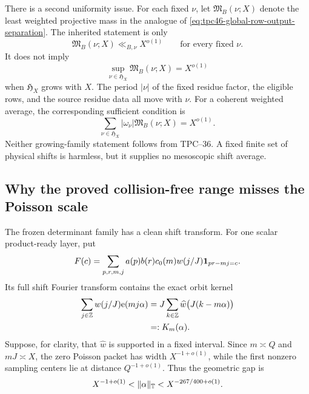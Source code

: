 There is a second uniformity issue.  For each fixed \(\nu\), let
\(\mathfrak M_B(\nu;X)\) denote the least weighted projective mass in
the analogue of
\eqref{eq:tpc46-global-row-output-separation}.  The inherited statement
is only
\begin{equation}
 \mathfrak M_B(\nu;X)\ll_{B,\nu}X^{o(1)}
 \qquad\text{for every fixed \(\nu\)}.
 \label{eq:tpc46-fixed-shift-projective-only}
\end{equation}
It does not imply
\begin{equation}
 \sup_{\nu\in\mathfrak H_X}\mathfrak M_B(\nu;X)=X^{o(1)}
 \label{eq:tpc46-missing-uniform-projective}
\end{equation}
when \(\mathfrak H_X\) grows with \(X\).  The period
\(|\nu|\) of the fixed residue factor, the eligible rows, and the
source residue data all move with \(\nu\).  For a coherent weighted
average, the corresponding sufficient condition is
\[
 \sum_{\nu\in\mathfrak H_X}
 |\omega_\nu|\mathfrak M_B(\nu;X)=X^{o(1)}.
\]
Neither growing-family statement follows from TPC--36.  A fixed finite
set of physical shifts is harmless, but it supplies no mesoscopic shift
average.

\subsection{Why the proved collision-free range misses the Poisson scale}

The frozen determinant family has a clean shift transform.  For one
scalar product-ready layer, put
\begin{equation}
 F(c)=
 \sum_{p,r,m,j}
 a(p)b(r)c_0(m)w(j/J)
 \mathbf 1_{pr-mj=c}.
 \label{eq:tpc46-frozen-shift-sequence}
\end{equation}
Its full shift Fourier transform contains the exact orbit kernel
\begin{align}
 \sum_{j\in\mathbb Z}w(j/J)\mathrm e(mj\alpha)
 &=J\sum_{k\in\mathbb Z}\widehat w\bigl(J(k-m\alpha)\bigr)
 \notag\\
 &=:K_m(\alpha).
 \label{eq:tpc46-Poisson-kernel}
\end{align}
Suppose, for clarity, that \(\widehat w\) is supported in a fixed
interval.  Since \(m\asymp Q\) and \(mJ\asymp X\), the zero Poisson
packet has width \(X^{-1+o(1)}\), while the first nonzero sampling
centers lie at distance \(Q^{-1+o(1)}\).  Thus the geometric gap is
\begin{equation}
 X^{-1+o(1)}
 <\|\alpha\|_{\mathbb T}<
 X^{-267/400+o(1)}.
 \label{eq:tpc46-Poisson-gap-scales}
\end{equation}

